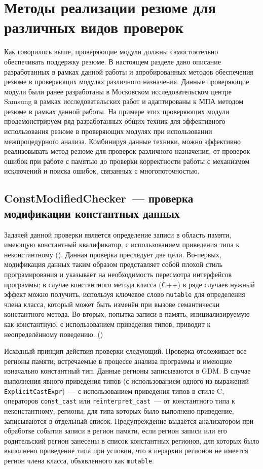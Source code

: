 \section{Методы реализации резюме для различных видов проверок}

Как говорилось выше, проверяющие модули должны самостоятельно обеспечивать поддержку резюме. В настоящем разделе дано описание разработанных в рамках данной работы и апробированных методов обеспечения резюме в проверяющих модулях различного назначения. Данные проверяющие модули были ранее разработаны в Московском исследовательском центре Samsung в рамках исследовательских работ и адаптированы к МПА методом резюме в рамках данной работы. На примере этих проверяющих модули продемонстрируем ряд разработанных общих техник для эффективного использования резюме в проверяющих модулях при использовании межпроцедурного анализа. Комбинируя данные техники, можно эффективно реализовывать метод резюме для проверок различного назначения, от проверок ошибок при работе с памятью до проверки корректности работы с механизмом исключений и поиска ошибок, связанных с многопоточностью.

\subsection{ConstModifiedChecker~--- проверка модификации константных данных}

Задачей данной проверки является определение записи в область памяти, имеющую константный квалификатор, с использованием приведения типа к неконстантному (). Данная проверка преследует две цели. Во-первых, модификация данных таким образом представляет собой плохой стиль програмирования и указывает на необходимость пересмотра интерфейсов программы; в случае константного метода класса (C++) в ряде случаев нужный эффект можно получить, используя ключевое слово \texttt{mutable} для определения члена класса, который может быть изменён при вызове семантически константного метода. Во-вторых, попытка записи в память, инициализируемую  как константную, с использованием приведения типов, приводит к неопределённому поведению. ()

Исходный принцип действия проверки следующий. Проверка отслеживает все регионы памяти, встречаемые в процессе анализа программы и имеющие изначально константный тип. Данные регионы записываются в GDM. В случае выполнения явного приведения типов (с использованием одного из выражений \texttt{ExplicitCastExpr})~--- с использованием приведения типов в стиле C, операторов \texttt{const\_cast} или \texttt{reinterpret\_cast}~--- от константного типа к неконстантному, регионы, для типа которых было выполнено приведение, записываются в отдельный список. Предупреждение выдаётся анализатором при обработке события записи в регион памяти, если регион записи или его родительский регион занесены в список константных регионов, для которых было выполнено приведение типа при условии, что в иерархии регионов не имеется регион члена класса, объявленного как \texttt{mutable}.

